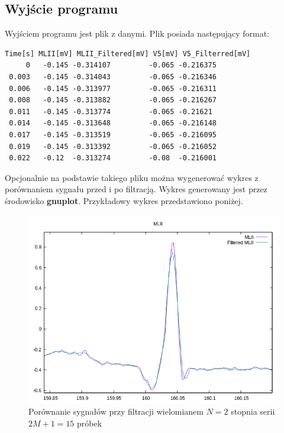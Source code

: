 \subsection{Wyjście programu}
Wyjściem programu jest plik z danymi. Plik posiada następujący format:
\begin{center}
\begin{lstlisting}[frame=single]
Time[s] MLII[mV] MLII_Filtered[mV] V5[mV] V5_Filterred[mV]
     0   -0.145 -0.314107         -0.065 -0.216375
 0.003   -0.145 -0.314043         -0.065 -0.216346
 0.006   -0.145 -0.313977         -0.065 -0.216311
 0.008   -0.145 -0.313882         -0.065 -0.216267
 0.011   -0.145 -0.313774         -0.065 -0.21621
 0.014   -0.145 -0.313648         -0.065 -0.216148
 0.017   -0.145 -0.313519         -0.065 -0.216095
 0.019   -0.145 -0.313392         -0.065 -0.216052
 0.022   -0.12  -0.313274         -0.08  -0.216001
\end{lstlisting}
\end{center}

Opcjonalnie na podstawie takiego pliku można wygenerować wykres z porównaniem sygnału przed i po filtracją. Wykres generowany jest przez środowisko \textbf{gnuplot}. Przykładowy wykres przedstawiono poniżej.

\begin{figure}[H]
  \begin{center}
    \includegraphics[scale=0.8]
    {img/implem.png}
  \end{center}
  \caption{Porównanie sygnałów przy filtracji wielomianem $N=2$ stopnia serii $2M+1=15$ próbek}
  \label{rys:implem}
\end{figure}


